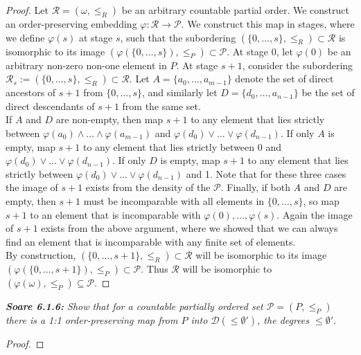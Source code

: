 \documentclass{article}
\begin{document}
\begin{proof}
    Let $\mathcal{R}=(\omega,\leq_R)$ be an arbitrary countable partial
    order. We construct an order-preserving embedding
    $\varphi:\mathcal{R}\rightarrow\mathcal{P}$. We construct this map in
    stages, where we define $\varphi(s)$ at stage $s$, such that the
    subordering $(\{0,\ldots,s\},\leq_R)\subset\mathcal{R}$ is isomorphic
    to its image $(\varphi(\{0,\ldots,s\}),\leq_P)\subset\mathcal{P}$. At
    stage 0, let $\varphi(0)$ be an arbitrary non-zero non-one element in
    $P$. At stage $s+1$, consider the subordering $\mathcal{R}_{s}
    :=(\{0,\ldots,s\},\leq_R)\subset\mathcal{R}$. Let
    $A=\{a_0,\ldots,a_{m-1}\}$ denote the set of direct ancestors of $s+1$
    from $\{0,\ldots,s\}$, and similarly let $D=\{d_0,\ldots,a_{n-1}\}$ be
    the set of direct descendants of $s+1$ from the same set. \\

    If $A$ and $D$ are non-empty, then map $s+1$ to any element that lies
    strictly between $\varphi(a_0)\wedge\ldots\wedge\varphi(a_{m-1})$ and
    $\varphi(d_0)\vee\ldots\vee\varphi(d_{n-1})$. If only $A$ is empty, map
    $s+1$ to any element that lies strictly between 0 and
    $\varphi(d_0)\vee\ldots\vee\varphi(d_{n-1})$. If only $D$ is empty, map
    $s+1$ to any element that lies strictly between
    $\varphi(d_0)\vee\ldots\vee\varphi(d_{n-1})$ and 1. Note that for these
    three cases the image of $s+1$ exists from the density of the
    $\mathcal{P}$. Finally, if both $A$ and $D$ are empty, then $s+1$ must
    be incomparable with all elements in $\{0,\ldots,s\}$, so map $s+1$ to
    an element that is incomparable with $\varphi(0),\ldots,\varphi(s)$.
    Again the image of $s+1$ exists from the above argument, where we
    showed that we can always find an element that is incomparable with any
    finite set of elements. \\

    By construction, $(\{0,\ldots,s+1\},\leq_R)\subset\mathcal{R}$ will be
    isomorphic to its image
    $(\varphi(\{0,\ldots,s+1\}),\leq_P)\subset\mathcal{P}$. Thus
    $\mathcal{R}$ will be isomorphic to
    $(\varphi(\omega),\leq_P)\subseteq\mathcal{P}$.
  \end{proof}

\it \textbf{Soare 6.1.6:} Show that for a countable partially ordered set
  $\mathcal{P}=(P,\leq_P)$ there is a 1:1 order-preserving map from $P$
  into $\mathcal{D}(\leq\emptyset')$, the degrees $\leq\emptyset'$.

  \begin{proof}
  \end{proof}
\end{document}
